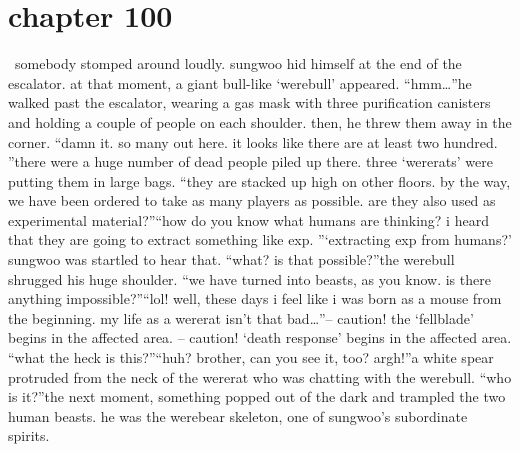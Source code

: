 \section{chapter 100}






 somebody stomped around loudly.
 sungwoo hid himself at the end of the escalator.
at that moment, a giant bull-like ‘werebull’ appeared.
“hmm…”he walked past the escalator, wearing a gas mask with three purification canisters and holding a couple of people on each shoulder.
 then, he threw them away in the corner.
“damn it.
 so many out here.
 it looks like there are at least two hundred.
”there were a huge number of dead people piled up there.
 three ‘wererats’ were putting them in large bags.
“they are stacked up high on other floors.
 by the way, we have been ordered to take as many players as possible.
 are they also used as experimental material?”“how do you know what humans are thinking? i heard that they are going to extract something like exp.
”‘extracting exp from humans?’ sungwoo was startled to hear that.
“what? is that possible?”the werebull shrugged his huge shoulder.
“we have turned into beasts, as you know.
 is there anything impossible?”“lol! well, these days i feel like i was born as a mouse from the beginning.
 my life as a wererat isn’t that bad…”– caution! the ‘fellblade’ begins in the affected area.
– caution! ‘death response’ begins in the affected area.
“what the heck is this?”“huh? brother, can you see it, too? argh!”a white spear protruded from the neck of the wererat who was chatting with the werebull.
“who is it?”the next moment, something popped out of the dark and trampled the two human beasts.
he was the werebear skeleton, one of sungwoo’s subordinate spirits.


